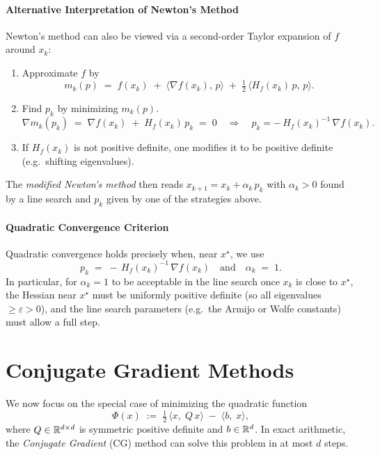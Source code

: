 \paragraph{Alternative Interpretation of Newton's Method}
Newton's method can also be viewed via a second-order Taylor expansion of \(f\) around \(x_k\):

\begin{enumerate}
    \item Approximate \(f\) by 
    \[
        m_k(p) \;=\; f(x_k) \;+\; \langle \nabla f(x_k),\, p\rangle \;+\; \tfrac12\,\langle H_f(x_k)\,p,\,p\rangle.
    \]
    \item Find \(p_k\) by minimizing \(m_k(p)\). 
    \[
      \nabla m_k(p_k) \;=\; \nabla f(x_k) \;+\; H_f(x_k)\,p_k \;=\; 0
      \quad\Longrightarrow\quad
      p_k = -\,H_f(x_k)^{-1}\,\nabla f(x_k).
    \]
    \item If \(H_f(x_k)\) is not positive definite, one modifies it to be positive definite (e.g.\ shifting eigenvalues).
\end{enumerate}

The \emph{modified Newton's method} then reads \(x_{k+1} = x_k + \alpha_k\,p_k\) with \(\alpha_k>0\) found by a line search and \(p_k\) given by one of the strategies above.

\paragraph{Quadratic Convergence Criterion}
Quadratic convergence holds precisely when, near \(x^\star\), we use
\[
    p_k \;=\; -\,H_f(x_k)^{-1}\,\nabla f(x_k)
    \quad\text{and}\quad
    \alpha_k \;=\; 1.
\]
In particular, for \(\alpha_k = 1\) to be acceptable in the line search once \(x_k\) is close to \(x^\star\), the Hessian near \(x^\star\) must be uniformly positive definite (so all eigenvalues \(\ge \varepsilon > 0\)), and the line search parameters (e.g.\ the Armijo or Wolfe constants) must allow a full step.

\section*{Conjugate Gradient Methods}

We now focus on the special case of minimizing the quadratic function
\[
\Phi(x) \;:=\; \tfrac12\,\langle x,\;Q\,x\rangle \;-\; \langle b,\;x\rangle,
\]
where \(Q \in \mathbb{R}^{d\times d}\) is symmetric positive definite and \(b \in \mathbb{R}^d\). In exact arithmetic, the \emph{Conjugate Gradient} (CG) method can solve this problem in at most \(d\) steps.

